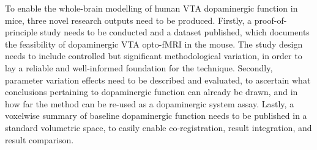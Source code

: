 To enable the whole-brain modelling of human VTA dopaminergic function in mice, three novel research outputs need to be produced.
Firstly, a proof-of-principle study needs to be conducted and a dataset published, which documents the feasibility of dopaminergic VTA opto-fMRI in the mouse.
The study design needs to include controlled but significant methodological variation, in order to lay a reliable and well-informed foundation for the technique.
Secondly, parameter variation effects need to be described and evaluated, to ascertain what conclusions pertaining to dopaminergic function can already be drawn, and in how far the method can be re-used as a dopaminergic system assay.
Lastly, a voxelwise summary of baseline dopaminergic function needs to be published in a standard volumetric space, to easily enable co-registration, result integration, and result comparison.
